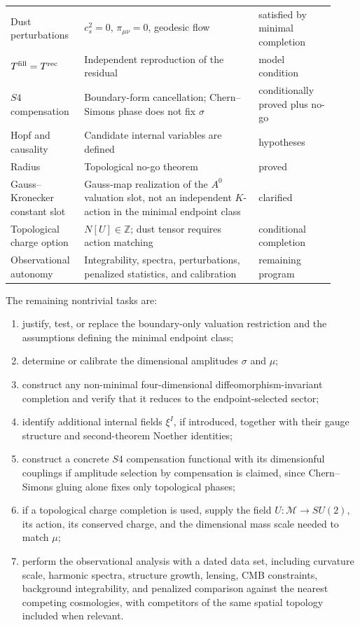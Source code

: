 \documentclass[11pt,a4paper]{article}
\def\Sfour{S4}%
\numberwithin{equation}{section}
\theoremstyle{remark}
\newcommand{\Sfour}{S^4}
\newcommand{\M}{\mathcal{M}}
\begin{document}
\begin{center}
\begin{tabular}{@{}p{0.20\linewidth}p{0.50\linewidth}p{0.22\linewidth}@{}}
Dust perturbations & \(c_s^2=0\), \(\pi_{\mu\nu}=0\), geodesic flow & satisfied by minimal completion \\
\(T^{\rm fill}=T^{\rm rec}\) & Independent reproduction of the residual & model condition \\
\(\Sfour\) compensation & Boundary-form cancellation; Chern--Simons phase does not fix \(\sigma\) & conditionally proved plus no-go \\
Hopf and causality & Candidate internal variables are defined & hypotheses \\
Radius & Topological no-go theorem & proved \\
Gauss--Kronecker constant slot & Gauss-map realization of the \(A^0\) valuation slot, not an independent \(K\)-action in the minimal endpoint class & clarified \\
Topological charge option & \(N[U]\in\mathbb{Z}\); dust tensor requires action matching & conditional completion \\
Observational autonomy & Integrability, spectra, perturbations, penalized statistics, and calibration & remaining program \\
\bottomrule
\end{tabular}
\end{center}

The remaining nontrivial tasks are:
\begin{enumerate}
\item justify, test, or replace the boundary-only valuation restriction and the assumptions defining the minimal endpoint class;
\item determine or calibrate the dimensional amplitudes \(\sigma\) and \(\mu\);
\item construct any non-minimal four-dimensional diffeomorphism-invariant completion and verify that it reduces to the endpoint-selected sector;
\item identify additional internal fields \(\xi^I\), if introduced, together with their gauge structure and second-theorem Noether identities;
\item construct a concrete \(\Sfour\) compensation functional with its dimensionful couplings if amplitude selection by compensation is claimed, since Chern--Simons gluing alone fixes only topological phases;
\item if a topological charge completion is used, supply the field \(U:\M\to SU(2)\), its action, its conserved charge, and the dimensional mass scale needed to match \(\mu\);
\item perform the observational analysis with a dated data set, including curvature scale, harmonic spectra, structure growth, lensing, CMB constraints, background integrability, and penalized comparison against the nearest competing cosmologies, with competitors of the same spatial topology included when relevant.
\end{enumerate}
\end{document}

